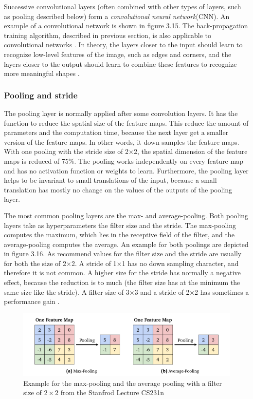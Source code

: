 Successive convolutional layers (often combined with other types of layers, such as pooling described below) form a \textit{convolutional neural network}(CNN).  An example of a convolutional network is shown in figure 3.15. The back-propagation training algorithm, described in previous section, is also applicable to convolutional networks \cite{goodfellow2016deep}.  In theory, the layers closer to the input should learn to recognize low-level features of the image, such as edges and corners, and the layers closer to the output should learn to combine these features to recognize more meaningful shapes \cite{fukushima1988neocognitron}.

\subsubsection*{Pooling and stride}
The pooling layer is normally applied after some convolution layers. It has the function to reduce the spatial size of the feature maps. This reduce the amount of parameters and the computation time, because the next layer get a smaller version of the feature maps. In other words, it down samples the feature maps. With one pooling with the stride size of 2×2, the spatial dimension of the feature maps is reduced of 75\%. The pooling works independently on every feature map and has no activation function or weights to learn. Furthermore, the pooling layer helps to be invariant to small translations of the input, because a small translation has mostly no change on the values of the outputs of the pooling layer.

The most common pooling layers are the max- and average-pooling. Both pooling layers take as hyperparameters the filter size and the stride. The max-pooling computes the maximum, which lies in the receptive field of the filter, and the average-pooling computes the average. An example for both poolings are depicted in figure 3.16. As recommend values for the filter size and the stride are usually for both the size of 2×2. A stride of 1×1 has no down sampling character, and therefore it is not common. A higher size for the stride has normally a negative effect, because the reduction is to much (the filter size has at the minimum the same size like the stride). A filter size of 3×3 and a stride of 2×2 has sometimes a performance gain \cite{krizhevsky2012imagenet}.

\begin{figure}[h]
	\includegraphics[width=\textwidth]{Figures/Section3_Poolinglayers.png} 
	\centering
	\captionsetup{justification=centering}
	\caption{Example for the max-pooling and the average pooling with a filter size of $2\times2$  from the Stanfrod Lecture CS231n \cite{li2015cs231n}}
	\label{fig:poolinglayer}
\end{figure}

